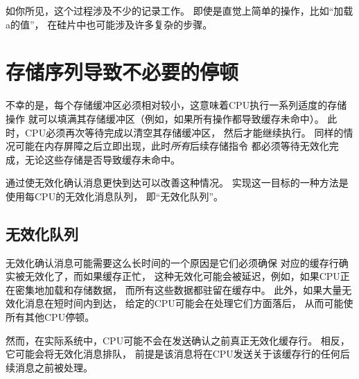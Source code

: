 \QuickQuizEnd

如你所见，这个过程涉及不少的记录工作。
即使是直觉上简单的操作，比如``加载a的值''，
在硅片中也可能涉及许多复杂的步骤。

\section{存储序列导致不必要的停顿}
\label{sec:app:whymb:Store Sequences Result in Unnecessary Stalls}

不幸的是，每个存储缓冲区必须相对较小，这意味着CPU执行一系列适度的存储操作
就可以填满其存储缓冲区（例如，如果所有操作都导致缓存未命中）。
此时，CPU必须再次等待完成以清空其存储缓冲区，
然后才能继续执行。
同样的情况可能在内存屏障之后立即出现，此时\emph{所有}后续存储指令
都必须等待无效化完成，无论这些存储是否导致缓存未命中。

通过使无效化确认消息更快到达可以改善这种情况。
实现这一目标的一种方法是使用每CPU的无效化消息队列，
即``无效化队列''。

\subsection{无效化队列}
\label{sec:app:whymb:Invalidate Queues}

无效化确认消息可能需要这么长时间的一个原因是它们必须确保
对应的缓存行确实被无效化了，而如果缓存正忙，
这种无效化可能会被延迟，例如，如果CPU正在密集地加载和存储数据，
而所有这些数据都驻留在缓存中。
此外，如果大量无效化消息在短时间内到达，
给定的CPU可能会在处理它们方面落后，
从而可能使所有其他CPU停顿。

然而，在实际系统中，CPU可能不会在发送确认之前真正无效化缓存行。
相反，它可能会将无效化消息排队，
前提是该消息将在CPU发送关于该缓存行的任何后续消息之前被处理。

